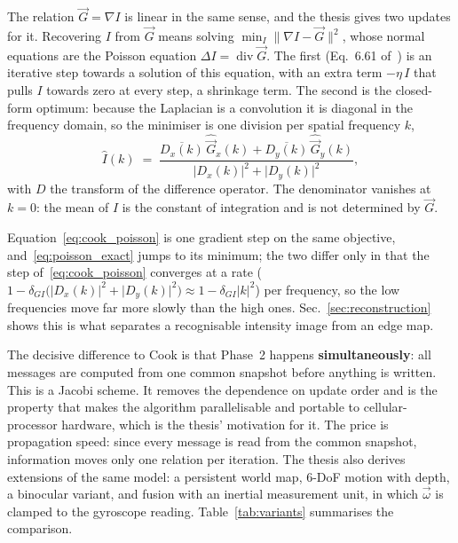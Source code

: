 \documentclass[journal]{IEEEtran}
\newcommand{\Imap}{I}
\newcommand{\Gmap}{\vec{G}}
\newcommand{\wvec}{\vec{\omega}}
\begin{document}
The relation $\Gmap=\nabla\Imap$ is linear in the same sense, and the thesis gives two updates for it. Recovering $\Imap$ from $\Gmap$ means solving $\min_{\Imap}\lVert\nabla\Imap-\Gmap\rVert^2$, whose normal equations are the Poisson equation $\Delta\Imap = \operatorname{div}\Gmap$. The first (Eq.~6.61 of~\cite{martel2019thesis}) is an iterative step towards a solution of this equation, with an extra term $-\eta\,\Imap$ that pulls $\Imap$ towards zero at every step, a shrinkage term. The second is the closed-form optimum: because the Laplacian is a convolution it is diagonal in the frequency domain, so the minimiser is one division per spatial frequency $k$,
\begin{equation}
\widehat{\Imap}(k) \;=\;
  \frac{\overline{D_x(k)}\,\widehat{\Gmap}_x(k)
      + \overline{D_y(k)}\,\widehat{\Gmap}_y(k)}
       {\lvert D_x(k)\rvert^2+\lvert D_y(k)\rvert^2},
\label{eq:poisson_exact}
\end{equation}
with $D$ the transform of the difference operator. The denominator vanishes at
$k=0$: the mean of $\Imap$ is the constant of integration and is not determined
by $\Gmap$. 

Equation~\eqref{eq:cook_poisson} is one gradient step on the same objective, and~\eqref{eq:poisson_exact} jumps to its minimum; the two differ only in that the step of~\eqref{eq:cook_poisson} converges at a rate ($1-\delta_{G\!I}\big(\lvert D_x(k)\rvert^2+\lvert D_y(k)\rvert^2\big)\approx 1-\delta_{G\!I}\lvert k\rvert^2$) per frequency, so the low frequencies move far more slowly than the high ones. Sec.~\ref{sec:reconstruction} shows this is what separates a recognisable intensity image from an edge map.

The decisive difference to Cook is that Phase~2 happens \textbf{simultaneously}:
all messages are computed from one common snapshot before anything is written.
This is a Jacobi scheme. It removes the dependence on update order and is the
property that makes the algorithm parallelisable and portable to cellular-processor hardware, which is the thesis' motivation for it. The price is propagation speed: since every message is read from the common snapshot, information moves only one relation per iteration. The thesis also derives extensions of the same model: a persistent world map, 6-DoF motion with depth, a binocular variant, and fusion with an inertial measurement unit, in which $\wvec$ is clamped to the gyroscope reading.
Table~\ref{tab:variants} summarises the comparison.
\end{document}

